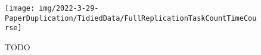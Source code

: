 \begin{figure}
    \centering
    \texttt{[image: img/2022-3-29-PaperDuplication/TidiedData/FullReplicationTaskCountTimeCourse]}
    \caption{TODO} \label{fig:FullReplicationTaskCountTimeCourse}
\end{figure}
